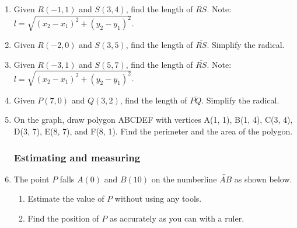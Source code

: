 \begin{enumerate}
\item Given $R(-1,1)$ and $S(3,4)$, find the length of $\overline{RS}$. Note: $l=\sqrt{(x_2-x_1)^2+(y_2-y_1)^2}$. %

\item Given $R(-2,0)$ and $S(3,5)$, find the length of $\overline{RS}$. Simplify the radical. %

\item Given $R(-3,1)$ and $S(5,7)$, find the length of $\overline{RS}$. Note: $l=\sqrt{(x_2-x_1)^2+(y_2-y_1)^2}$. %

\item Given $P(7,0)$ and $Q(3,2)$, find the length of $\overline{PQ}$. Simplify the radical.


\item On the graph, draw polygon ABCDEF with vertices A(1, 1), B(1, 4), C(3, 4), D(3, 7), E(8, 7), and F(8, 1). Find the perimeter and the area of the polygon.\\[1cm]
\vspace{2cm}



\newpage
\subsubsection*{Estimating and measuring}
\item The point $P$ falls $A(0)$ and $B(10)$ on the numberline $\overleftrightarrow{AB}$ as shown below. \\[15pt] %
\begin{enumerate}
  \item Estimate the value of $P$ without using any tools. \vspace{1cm} 
  \item Find the position of $P$ as accurately as you can with a ruler. 
\end{enumerate} \vspace{1cm} 


\end{enumerate}
